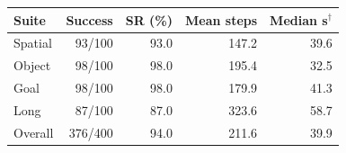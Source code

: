 \begin{tabular}{lrrrr}
\toprule
Suite & Success & SR (\%) & Mean steps & Median s$^\dagger$ \\
\midrule
Spatial & 93/100 & 93.0 & 147.2 & 39.6 \\
Object & 98/100 & 98.0 & 195.4 & 32.5 \\
Goal & 98/100 & 98.0 & 179.9 & 41.3 \\
Long & 87/100 & 87.0 & 323.6 & 58.7 \\
\midrule
Overall & 376/400 & 94.0 & 211.6 & 39.9 \\
\bottomrule
\end{tabular}
